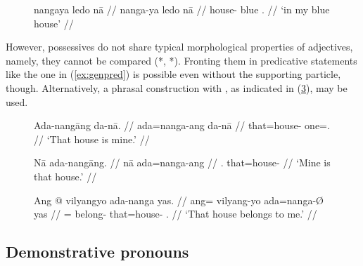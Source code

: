 \begin{figure}[h]
\ex\label{ex:adjgen}%
\begingl
	\gla nangaya ledo nā //
	\glb nanga-ya ledo nā //
	\glc house-\Loc{} blue \Fsg{}.\Gen{} //
	\glft `in my blue house' //
\endgl
\xe
\end{figure}

However, possessives do not share typical morphological properties of
adjectives, namely, they cannot be compared (*,
*). Fronting them in predicative statements like
the one in (\ref{ex:genpred}) is possible even without the supporting particle,
though. Alternatively, a phrasal construction with
, as indicated in (\ref{ex:genphrase}), may be
used.

\begin{figure}[h]
\pex\label{ex:genpred}
\a\label{ex:genpred_1}\begingl
	\gla Ada-nangāng da-nā. //
	\glb ada=nanga-ang da-nā //
	\glc that=house-\Aarg{} one=\Fsg{}.\Gen{} //
	\glft `That house is mine.' //
\endgl

\a\label{ex:genpred_2}\begingl
	\gla Nā ada-nangāng. //
	\glb nā ada=nanga-ang //
	\glc \Fsg{}.\Gen{} that=house-\Aarg{} //
	\glft `Mine is that house.' //
\endgl
\xe
\end{figure}

\begin{figure}[h]
\ex\label{ex:genphrase}%
\begingl
	\gla Ang @ vilyangyo ada-nanga yas. //
	\glb ang= vilyang-yo ada=nanga-Ø yas //
	\glc \AgtT{}= belong-\TsgN{} that=house-\Top{} \Fsg{}.\Parg{} //
	\glft `That house belongs to me.' //
\endgl
\xe
\end{figure}


\subsection{Demonstrative pronouns}
\label{subsec:dempro}

